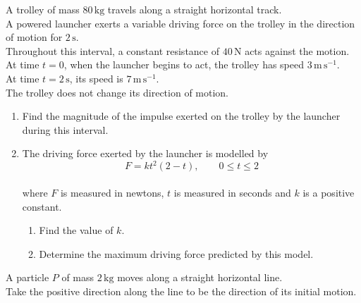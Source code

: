 \documentclass[leqno]{article}
\begin{document}
\begin{enumerate}[
  label=\textbf{\arabic*.},
  leftmargin=*,
  topsep=0pt,
  partopsep=0pt,
  parsep=0pt
]
\newpage

\questionitem

A trolley of mass $80\,\mathrm{kg}$ travels along a straight horizontal track. \\
A powered launcher exerts a variable driving force on the trolley in the direction of motion for $2\,\mathrm{s}$. \\
Throughout this interval, a constant resistance of $40\,\mathrm{N}$ acts against the motion. \\

At time $t=0$, when the launcher begins to act, the trolley has speed $3\,\mathrm{m\,s^{-1}}$. \\
At time $t=2\,\mathrm{s}$, its speed is $7\,\mathrm{m\,s^{-1}}$. \\
The trolley does not change its direction of motion. \\
\begin{enumerate}[label=\textbf{(\alph*)}]
\item Find the magnitude of the impulse exerted on the trolley by the launcher during this interval.  \\
\item The driving force exerted by the launcher is modelled by
\[
F=kt^2(2-t),\qquad 0\leq t\leq 2
\] \\
where $F$ is measured in newtons, $t$ is measured in seconds and $k$ is a positive constant. \\
\begin{enumerate}[label=(\roman*)]
\item Find the value of $k$.  \\
\item Determine the maximum driving force predicted by this model.  \\
\end{enumerate}
\end{enumerate}

\newpage

\questionitem

A particle $P$ of mass $2\,\mathrm{kg}$ moves along a straight horizontal line. \\
Take the positive direction along the line to be the direction of its initial motion. \\


\end{enumerate}
\end{document}
